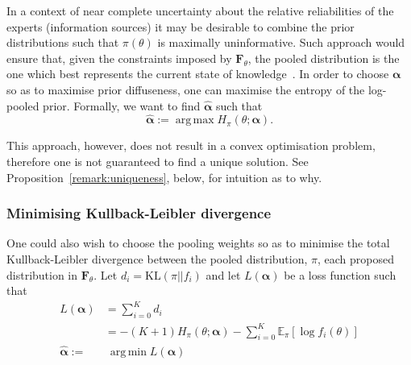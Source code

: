 \documentclass[a4paper, notitlepage, 10pt]{article}
\DeclareMathOperator*{\argmin}{arg\,min}
\DeclareMathOperator*{\argmax}{arg\,max}
\begin{document}
In a context of near complete uncertainty about the relative reliabilities of the experts (information sources) it may be desirable to combine the prior distributions such that $\pi(\theta)$ is maximally uninformative. %
Such approach would ensure that, given the constraints imposed by $\mathbf{F}_{\theta}$, the pooled distribution is the one which best represents the current state of knowledge~\citep{jaynes1957,savchuk1994}.
In order to choose $\boldsymbol\alpha$ so as to maximise prior 
diffuseness, one can maximise the entropy of the log-pooled prior.  
%
%
Formally, we want to find $\hat{\boldsymbol\alpha}$ such that
\begin{equation}
\label{eq:argmaxEnt}
 \hat{\boldsymbol\alpha}:= \argmax H_{\pi}(\theta; \boldsymbol\alpha).
\end{equation}

This approach, however, does not result in a convex optimisation problem, therefore one is not guaranteed to find a unique solution. 
See Proposition~\ref{remark:uniqueness}, below, for intuition as to why.

\subsubsection{Minimising Kullback-Leibler divergence}
\label{sec:minKL}

One could also wish to choose the pooling weights so as to minimise the total Kullback-Leibler divergence between the pooled distribution, $\pi$, each proposed distribution in $\mathbf{F}_{\theta}$.
Let $d_i = \text{KL}(\pi || f_i)$ and let $L(\boldsymbol\alpha)$ be a loss function such that
\begin{align}
L(\boldsymbol\alpha) &= \sum_{i=0}^K d_i \\
\label{eq:KLexpanded}
     &= - (K+1) H_\pi(\theta; \boldsymbol\alpha)  - \sum_{i=0}^K \mathbb{E}_\pi\left[\log f_i(\theta) \right] \\
     \label{eq:argminKL}
     \hat{\boldsymbol\alpha}:=& \:\argmin L(\boldsymbol\alpha)   
\end{align}
\end{document}
